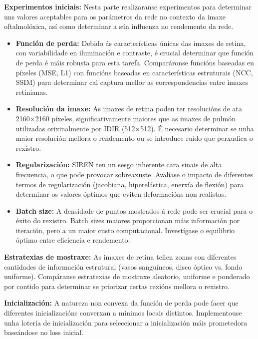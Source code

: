 
\textbf{Experimentos iniciais:} Nesta parte realizaranse experimentos para determinar uns valores aceptables para os parámetros da rede no contexto da imaxe oftalmolóxica, 
así como determinar a súa influenza no rendemento da rede.

\begin{itemize}
    \item \textbf{Función de perda:} Debido ás características únicas das imaxes de retina, con variabilidade en iluminación e contraste, é crucial determinar que función de perda é máis robusta para esta tarefa. Comparáronse funcións baseadas en píxeles (MSE, L1) con funcións baseadas en características estruturais (NCC, SSIM) para determinar cal captura mellor as correspondencias entre imaxes retinianas.
    \item \textbf{Resolución da imaxe:} As imaxes de retina poden ter resolucións de ata 2160×2160 píxeles, significativamente maiores que as imaxes de pulmón utilizadas orixinalmente por IDIR (512×512). É necesario determinar se unha maior resolución mellora o rendemento ou se introduce ruído que perxudica o rexistro.
    \item \textbf{Regularización:} SIREN ten un sesgo inherente cara sinais de alta frecuencia, o que pode provocar sobreaxuste. Avalíase o impacto de diferentes termos de regularización (jacobiana, hiperelástica, enerxía de flexión) para determinar os valores óptimos que eviten deformacións non realistas.
    \item \textbf{Batch size:} A densidade de puntos mostrados á rede pode ser crucial para o éxito do rexistro. Batch sizes maiores proporcionan máis información por iteración, pero a un maior custo computacional. Investígase o equilibrio óptimo entre eficiencia e rendemento.
\end{itemize}

\textbf{Estratexias de mostraxe:} As imaxes de retina teñen zonas con diferentes cantidades de información estrutural (vasos sanguíneos, disco óptico vs. fondo uniforme). Compáranse estratexias de mostraxe aleatorio, uniforme e ponderado por contido para determinar se priorizar certas rexións mellora o rexistro.

\textbf{Inicialización:} A natureza non convexa da función de perda pode facer que diferentes inicializacións converxan a mínimos locais distintos. Implementouse unha lotería de inicialización para seleccionar a inicialización máis prometedora baseándose no loss inicial.


